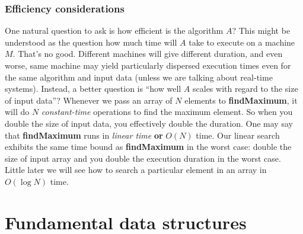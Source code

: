 \documentclass[oneside]{book}
\begin{document}
\subsection{Efficiency considerations}
One natural question to ask is how efficient is the algorithm $A$? This might be understood as the question how much time will $A$ take to execute on a machine $M$. That's no good. Different machines will give different duration, and even worse, same machine may yield particularly dispersed execution times even for the same algorithm and input data (unless we are talking about real-time systems). Instead, a better question is ``how well $A$ scales with regard to the size of input data''? Whenever we pass an array of $N$ elements to \textbf{findMaximum}, it will do $N$ \textit{constant-time} operations to find the maximum element. So when you double the size of input data, you effectively double the duration. One may say that \textbf{findMaximum} runs in \textit{linear time} \textbf{or} $O(N)$ time. Our linear search exhibits the same time bound as \textbf{findMaximum} in the worst case: double the size of input array and you double the execution duration in the worst case. Little later we will see how to search a particular element in an array in $O(\log N)$ time.

\chapter{Fundamental data structures}
\end{document}
